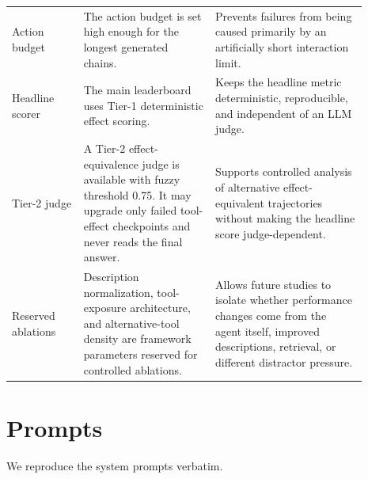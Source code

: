 \begin{table}[t]
\begin{tabular}{p{0.18\linewidth}p{0.33\linewidth}p{0.38\linewidth}}
Action budget &
The action budget is set high enough for the longest generated chains. &
Prevents failures from being caused primarily by an artificially short
interaction limit. \\

Headline scorer &
The main leaderboard uses Tier-1 deterministic effect scoring. &
Keeps the headline metric deterministic, reproducible, and independent of an
LLM judge. \\

Tier-2 judge &
A Tier-2 effect-equivalence judge is available with fuzzy threshold 0.75. It
may upgrade only failed tool-effect checkpoints and never reads the final
answer. &
Supports controlled analysis of alternative effect-equivalent trajectories
without making the headline score judge-dependent. \\

Reserved ablations &
Description normalization, tool-exposure architecture, and alternative-tool
density are framework parameters reserved for controlled ablations. &
Allows future studies to isolate whether performance changes come from the
agent itself, improved descriptions, retrieval, or different distractor
pressure. \\

\bottomrule
\end{tabular}
\end{table}


\section{Prompts}
\label{app:prompts}
We reproduce the system prompts verbatim.

